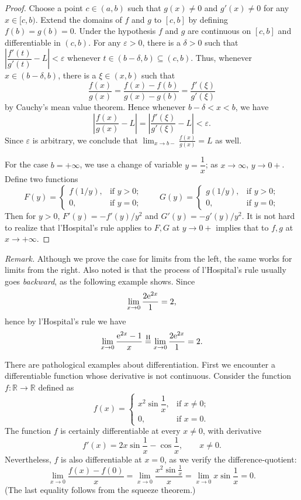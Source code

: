 \begin{proof}
  Choose a point $c \in (a,b)$ such that $g(x) \ne 0$ and $g'(x) \ne 0$ for any $x \in [c,b)$.
  Extend the domains of $f$ and $g$ to $[c,b]$ by defining $f(b) = g(b) = 0$.
  Under the hypothesis $f$ and $g$ are continuous on $[c,b]$ and differentiable in $(c,b)$.
  For any $\varepsilon > 0$, there is a $\delta > 0$ such that $\left| \dfrac{f'(t)}{g'(t)} - L \right| < \varepsilon$ whenever $t \in (b-\delta, b) \subseteq (c,b)$.
  Thus, whenever $x \in (b-\delta, b)$, there is a $\xi \in (x,b)$ such that
  \[
    \frac{f(x)}{g(x)} = \frac{ f(x) - f(b) }{ g(x) - g(b) } = \frac{ f'(\xi) }{ g'(\xi) }
  \]
  by Cauchy's mean value theorem.  Hence whenever $b - \delta < x < b$, we have
  \[
    \left| \frac{f(x)}{g(x)} - L \right| = \left| \frac{ f'(\xi) }{ g'(\xi) } - L \right| < \varepsilon.
  \]
  Since $\varepsilon$ is arbitrary, we conclude that $\displaystyle \lim_{x \to b-} \frac{f(x)}{g(x)} = L$ as well.

  For the case $b = +\infty$, we use a change of variable $y = \dfrac1x$; as $x \to \infty$, $y \to 0+$.
  Define two functions
  \[
    F(y) = 
    \begin{cases}
      f(1/y), & \text{if $y > 0$}; \\
      0     , & \text{if $y = 0$};
    \end{cases}
    \qquad
    G(y) = 
    \begin{cases}
      g(1/y), & \text{if $y > 0$}; \\
      0     , & \text{if $y = 0$};
    \end{cases}
  \]
  Then for $y > 0$, $F'(y) = -f'(y)/y^2$ and $G'(y) = -g'(y)/y^2$.
  It is not hard to realize that l'Hospital's rule applies to $F, G$ at $y \to 0+$ implies that to $f,g$ at $x \to +\infty$.
\end{proof}

\noindent\textit{Remark.} Although we prove the case for limits from the left, the same works for limits from the right.
Also noted is that the process of l'Hospital's rule usually goes \textit{backward}, as the following example shows.
Since
\[
  \lim_{x \to 0} \frac{ 2 \mathrm e^{2x} }{1} = 2,
\]
hence by l'Hospital's rule we have
\[
  \lim_{x \to 0} \frac{ \mathrm e^{2x} - 1 }{ x } \stackrel{\textrm{H}}{=} \lim_{x \to 0} \frac{ 2 \mathrm e^{2x} }{ 1 } = 2.
\]

There are pathological examples about differentiation.
First we encounter a differentiable function whose derivative is not continuous.
Consider the function $f: \mathbb{R} \to \mathbb{R}$ defined as
\[
  f(x) = 
  \begin{cases}
    x^2 \sin \dfrac{1}{x}, & \text{if $x \ne 0$}; \\
    0,                     & \text{if $x = 0$}.
  \end{cases}
\]
The function $f$ is certainly differentiable at every $x \ne 0$, with derivative
\[
  f'(x) = 2x \sin \dfrac1x - \cos \dfrac1x, \qquad x \ne 0.
\]
Nevertheless, $f$ is also differentiable at $x = 0$, as we verify the difference-quotient:
\[
  \lim_{x\to 0} \frac{ f(x) - f(0) }{ x }
  = \lim_{x\to 0} \frac{x^2 \sin \frac1x}{x} 
  = \lim_{x\to 0} x \sin \frac1x = 0.
\]
(The last equality follows from the squeeze theorem.)

